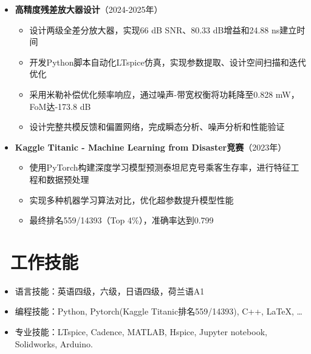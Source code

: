 \documentclass[11pt]{article}
\begin{document}
\begin{itemize}
\begin{itemize}
        \item 进行方块电阻测量、ELM测量和横向扩散分析，验证仿真模型准确性
    \end{itemize}
    \item \textbf{高精度残差放大器设计}（2024-2025年）
    \begin{itemize}
        \item 设计两级全差分放大器，实现66 dB SNR、80.33 dB增益和24.88 ns建立时间
        \item 开发Python脚本自动化LTspice仿真，实现参数提取、设计空间扫描和迭代优化
        \item 采用米勒补偿优化频率响应，通过噪声-带宽权衡将功耗降至0.828 mW，FoM达-173.8 dB
        \item 设计完整共模反馈和偏置网络，完成瞬态分析、噪声分析和性能验证
    \end{itemize}
    \item \textbf{Kaggle Titanic - Machine Learning from Disaster竞赛}（2023年）
    \begin{itemize}
        \item 使用PyTorch构建深度学习模型预测泰坦尼克号乘客生存率，进行特征工程和数据预处理
        \item 实现多种机器学习算法对比，优化超参数提升模型性能
        \item 最终排名559/14393（Top 4\%），准确率达到0.799
    \end{itemize}


    
\end{itemize}


\section{\makebox[\widthof{\faGraduationCap}][c]{\color{CVBlue}\faWrench}\ 工作技能}

\begin{itemize}
	\item 语言技能：英语四级，六级，日语四级，荷兰语A1
	\item 编程技能：Python, Pytorch(Kaggle Titanic排名559/14393),  C++, \LaTeX, \ldots
	\item 专业技能：LTspice, Cadence, MATLAB, Hspice, Jupyter notebook, Solidworks, Arduino.

\end{itemize}



\end{document}
